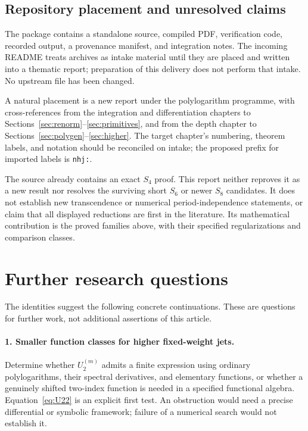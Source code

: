 \documentclass[11pt]{article}
\numberwithin{equation}{section}
\theoremstyle{definition}\newtheorem{definition}[theorem]{Definition}
\theoremstyle{remark}\newtheorem{remark}[theorem]{Remark}
\begin{document}
\subsection{Repository placement and unresolved claims}
The package contains a standalone source, compiled PDF, verification code,
recorded output, a provenance manifest, and integration notes. The incoming
README treats archives as intake material until they are placed and
written into a thematic report; preparation of this delivery does not
perform that intake. No upstream file has been changed.

A natural placement is a new report under the polylogarithm programme,
with cross-references from the integration and differentiation chapters to
Sections~\ref{sec:renorm}--\ref{sec:primitives}, and from the depth chapter
to Sections~\ref{sec:polygen}--\ref{sec:higher}. The target chapter's
numbering, theorem labels, and notation should be reconciled on intake;
the proposed prefix for imported labels is \texttt{nhj:}.

The source already contains an exact $S_4$ proof. This report neither
reproves it as a new result nor resolves the surviving short $S_6$ or newer
$S_8$ candidates. It does not establish new transcendence or numerical
period-independence statements, or claim that all displayed reductions
are first in the literature. Its mathematical contribution is the proved
families above, with their specified regularizations and comparison classes.

\section{Further research questions}
\label{sec:questions}
The identities suggest the following concrete continuations. These are
questions for further work, not additional assertions of this article.

\paragraph{1. Smaller function classes for higher fixed-weight jets.}
Determine whether $U_2^{(m)}$ admits a finite expression using ordinary
polylogarithms, their spectral derivatives, and elementary functions, or
whether a genuinely shifted two-index function is needed in a specified
functional algebra. Equation~\eqref{eq:U22} is an explicit first test.
An obstruction would need a precise differential or symbolic framework;
failure of a numerical search would not establish it.
\end{document}

